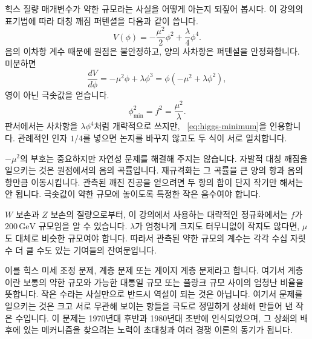 \begin{classroomqa}
\end{classroomqa}

힉스 질량 매개변수가 약한 규모라는 사실을 어떻게 아는지 되짚어 봅시다. 이 강의의 표기법에 따라 대칭 깨짐 퍼텐셜을 다음과 같이 씁니다.
\begin{equation}
V(\phi)=-\frac{\mu^2}{2}\phi^2+\frac{\lambda}{4}\phi^4.
\label{eq:higgs-potential}
\end{equation}
음의 이차항 계수 때문에 원점은 불안정하고, 양의 사차항은 퍼텐셜을 안정화합니다. 미분하면
\begin{equation}
\frac{dV}{d\phi}=-\mu^2\phi+\lambda\phi^3
=\phi(-\mu^2+\lambda\phi^2),
\end{equation}
영이 아닌 극솟값을 얻습니다.
\begin{equation}
\phi_{\min}^2=f^2=\frac{\mu^2}{\lambda}.
\label{eq:higgs-minimum}
\end{equation}
판서에서는 사차항을 \(\lambda\phi^4\)처럼 개략적으로 쓰지만, ~\eqref{eq:higgs-minimum}을 인용합니다. 관례적인 인자 \(1/4\)를 넣으면 논지를 바꾸지 않고도 두 식이 서로 일치합니다.

\(-\mu^2\)의 부호는 중요하지만 자연성 문제를 해결해 주지는 않습니다. 자발적 대칭 깨짐을 일으키는 것은 원점에서의 음의 곡률입니다. 재규격화는 그 곡률을 큰 양의 항과 음의 항만큼 이동시킵니다. 관측된 깨진 진공을 얻으려면 두 항의 합이 단지 작기만 해서는 안 됩니다. 극솟값이 약한 규모에 놓이도록 특정한 작은 음수여야 합니다.

\(W\) 보손과 \(Z\) 보손의 질량으로부터, 이 강의에서 사용하는 대략적인 정규화에서는 \(f\)가 \(200\,\mathrm{GeV}\) 규모임을 알 수 있습니다. \(\lambda\)가 엄청나게 크지도 터무니없이 작지도 않다면, \(\mu\)도 대체로 비슷한 규모여야 합니다. 따라서 관측된 약한 규모의 계수는 각각 수십 자릿수 더 클 수도 있는 기여들의 잔여분입니다.

이를 힉스 미세 조정 문제, 계층 문제 또는 게이지 계층 문제라고 합니다. 여기서 계층이란 보통의 약한 규모와 가능한 대통일 규모 또는 플랑크 규모 사이의 엄청난 비율을 뜻합니다. 작은 수라는 사실만으로 반드시 역설이 되는 것은 아닙니다. 여기서 문제를 일으키는 것은 크고 서로 무관해 보이는 항들을 극도로 정밀하게 상쇄해 만들어 낸 작은 수입니다. 이 문제는 1970년대 후반과 1980년대 초반에 인식되었으며, 그 상쇄의 배후에 있는 메커니즘을 찾으려는 노력이 초대칭과 여러 경쟁 이론의 동기가 됩니다.

